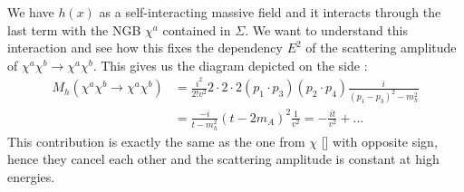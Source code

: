 \documentclass[../main.tex]{subfiles}
\begin{document}
We have $h(x)$ as a self-interacting massive field and it interacts through the last term with the NGB $\chi^a$ contained in $\Sigma$. We want to understand this interaction and see how this fixes the dependency $E^2$ of the scattering amplitude of $\chi^a\chi^b\to\chi^a\chi^b$. This gives us the diagram depicted on the side :
\begin{align*}
M_h(\chi^a\chi^b\to\chi^a\chi^b)&=\frac{i^2}{2!v^2}2\cdot2\cdot2(p_1\cdot p_3)(p_2\cdot p_4)\frac{i}{(p_1-p_3)^2-m_h^2}\\
&=\frac{-i}{t-m_h^2}(t-2m_A)^2\frac{1}{v^2}=-\frac{it}{v^2}+\dots
\end{align*}
This contribution is exactly the same as the one from $\chi$ [] with opposite sign, hence they cancel each other and the scattering amplitude is constant at high energies. 
\end{document}
